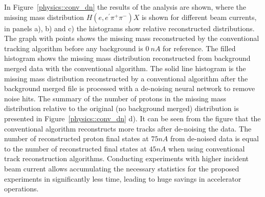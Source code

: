 In Figure~\ref{physics::conv_dn} the results of the analysis are shown, where the missing mass distribution $H(e,e^\prime\pi^+\pi^-)X$ is shown for different beam currents, in panels a), b) and c) the histograms show relative reconstructed distributions. The graph with points shows the missing mass reconstructed by the conventional tracking algorithm before any background is $0~nA$ for reference. The filled histogram shows the missing mass distribution reconstructed from background merged data with the conventional algorithm. The solid line histogram is the missing mass distribution reconstructed by a conventional algorithm after the background merged file is processed with a de-noising neural network to remove noise hits.
The summary of the number of protons in the missing mass distribution relative to the original (no background merged) distribution is presented in Figure~\ref{physics::conv_dn} d). It can be seen from the figure that the conventional algorithm reconstructs more tracks after de-noising the data. The number of reconstructed proton final states at $75nA$ from de-noised data is equal to the number of reconstructed final states at $45nA$ when using conventional track reconstruction algorithms.  Conducting experiments with higher incident beam current allows accumulating the necessary statistics for the proposed experiments in significantly less time, leading to huge savings in accelerator operations.






